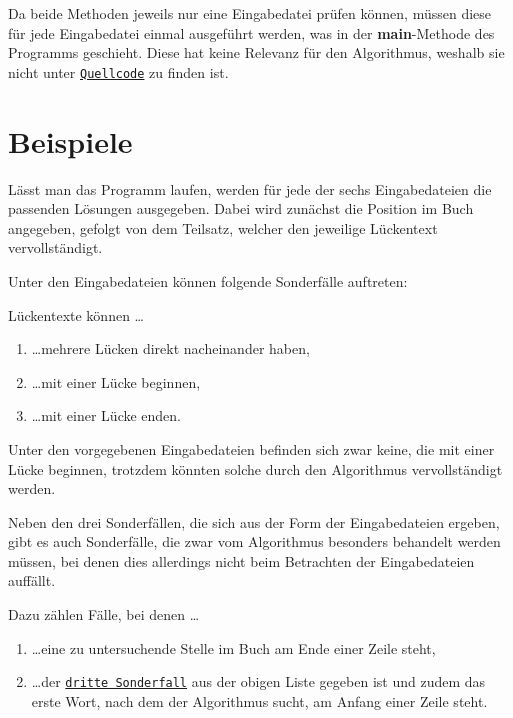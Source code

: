 \documentclass[a4paper, 10pt, ngerman]{scrartcl}
\begin{document}
Da beide Methoden jeweils nur eine Eingabedatei prüfen können,
müssen diese für jede Eingabedatei einmal ausgeführt werden,
was in der \textbf{main}-Methode des Programms geschieht.
Diese hat keine Relevanz für den Algorithmus,
weshalb sie nicht unter \hyperref[sec:quellcode]{\texttt{Quellcode}} zu finden ist.
		

\section{Beispiele}\label{sec:beispiele}
Lässt man das Programm laufen,
werden für jede der sechs Eingabedateien die passenden Lösungen ausgegeben.
Dabei wird zunächst die Position im Buch angegeben,
gefolgt von dem Teilsatz,
welcher den jeweilige Lückentext vervollständigt.

Unter den Eingabedateien können folgende Sonderfälle auftreten:

Lückentexte können \ldots

\begin{enumerate}
	\item \ldots mehrere Lücken direkt nacheinander haben,\label{sonderfallEins}
	\item \ldots mit einer Lücke beginnen,\label{sonderfallZwei}
	\item \ldots mit einer Lücke enden.\label{sonderfallDrei}
    \setcounter{enumTemp}{\theenumi}
\end{enumerate}
		
Unter den vorgegebenen Eingabedateien befinden sich zwar keine,
die mit einer Lücke beginnen,
trotzdem könnten solche durch den Algorithmus vervollständigt werden.

Neben den drei Sonderfällen,
die sich aus der Form der Eingabedateien ergeben,
gibt es auch Sonderfälle,
die zwar vom Algorithmus besonders behandelt werden müssen,
bei denen dies allerdings nicht beim Betrachten der Eingabedateien auffällt.

Dazu zählen Fälle,
bei denen \ldots

\begin{enumerate}
	\setcounter{enumi}{\theenumTemp}
	\item \ldots eine zu untersuchende Stelle im Buch am Ende einer Zeile steht,\label{sonderfallVier}
	\item \ldots der \hyperref[sonderfallDrei]{\texttt{dritte Sonderfall}} aus der obigen Liste gegeben ist
	und zudem das erste Wort,
	nach dem der Algorithmus sucht,
	am Anfang einer Zeile steht.\label{sonderfallFünf}
\end{enumerate}
\end{document}
